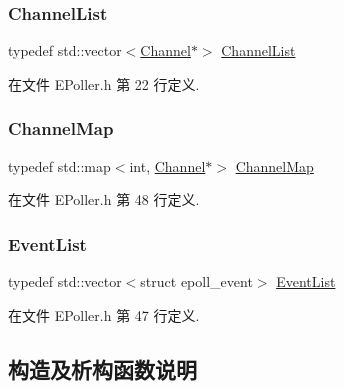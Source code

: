 \subsubsection{\texorpdfstring{Channel\+List}{ChannelList}}
{\footnotesize\ttfamily typedef std\+::vector$<$\hyperlink{classmuduo_1_1Channel}{Channel}$\ast$$>$ \hyperlink{classmuduo_1_1EPoller_a0b74248ffee6df294563618187b52404}{Channel\+List}}



在文件 E\+Poller.\+h 第 22 行定义.

\mbox{\label{classmuduo_1_1EPoller_a950db725d18ce33d8457ae784380a07e}} 
\subsubsection{\texorpdfstring{Channel\+Map}{ChannelMap}}
{\footnotesize\ttfamily typedef std\+::map$<$int, \hyperlink{classmuduo_1_1Channel}{Channel}$\ast$$>$ \hyperlink{classmuduo_1_1EPoller_a950db725d18ce33d8457ae784380a07e}{Channel\+Map}\hspace{0.3cm}{\ttfamily [private]}}



在文件 E\+Poller.\+h 第 48 行定义.

\mbox{\label{classmuduo_1_1EPoller_ac074005c5f2127640fb6a6e22aa58bae}} 
\subsubsection{\texorpdfstring{Event\+List}{EventList}}
{\footnotesize\ttfamily typedef std\+::vector$<$struct epoll\+\_\+event$>$ \hyperlink{classmuduo_1_1EPoller_ac074005c5f2127640fb6a6e22aa58bae}{Event\+List}\hspace{0.3cm}{\ttfamily [private]}}



在文件 E\+Poller.\+h 第 47 行定义.



\subsection{构造及析构函数说明}
\mbox{\label{classmuduo_1_1EPoller_ac03e04dfa659758294b0478a70b1df17}} 
